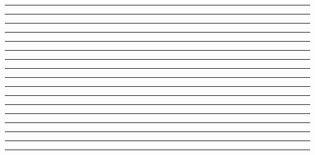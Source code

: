 \documentclass{article}
\begin{document}
\newpage
\noindent{}\rule{1cm}{0.025cm}\framebox{\rule{1cm}{1cm}}

\newpage
\noindent{}\rule{1cm}{0.025cm}

\newpage
\noindent{}\rule{1cm}{0.025cm}

\newpage
\noindent{}\rule{1cm}{0.025cm}

\newpage
\noindent{}\rule{1cm}{0.025cm}

\newpage
\noindent{}\rule{1cm}{0.025cm}

\newpage
\noindent{}\rule{1cm}{0.025cm}\framebox{{\normalsize [H]}}

\newpage
\noindent{}\rule{1cm}{0.025cm}

\newpage
\noindent{}\rule{1cm}{0.025cm}

\newpage
\noindent{}\rule{1cm}{0.025cm}

\newpage
\noindent{}\rule{1cm}{0.025cm}

\newpage
\noindent{}\rule{1cm}{0.025cm}

\newpage
\noindent{}\rule{1cm}{0.025cm}

\newpage
\noindent{}\rule{1cm}{0.025cm}

\newpage
\noindent{}\rule{1cm}{0.025cm}

\newpage
\noindent{}\rule{1cm}{0.025cm}

\newpage
\noindent{}\rule{1cm}{0.025cm}
\end{document}

